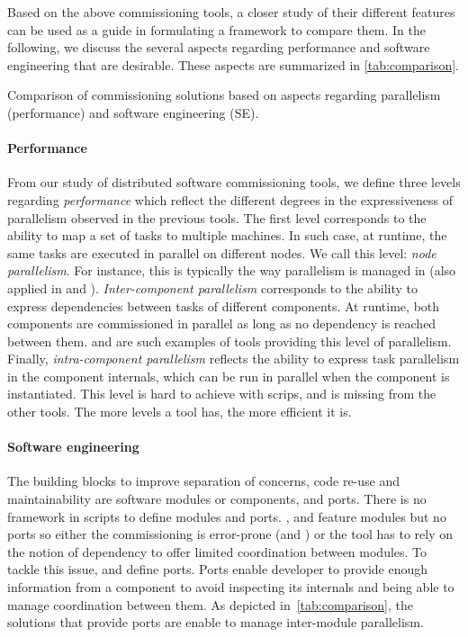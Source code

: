 Based on the above commissioning tools, a closer study of their different
features can be used as a guide in formulating a framework to compare them. In
the following, we discuss the several aspects regarding performance and software
engineering that are desirable. These aspects are summarized in
\cref{tab:comparison}.

\begin{table}[tp]
  \centering
  \small
  
  \caption{Comparison of commissioning solutions based on aspects
  regarding parallelism (performance) and software engineering (SE).}
  \label{tab:comparison}
\end{table}

\paragraph{Performance}
From our study of distributed software commissioning tools, we define three
levels regarding \emph{performance} which reflect the different degrees in
the expressiveness of parallelism observed in the previous tools.
The first level corresponds to the ability to map a set of tasks to multiple
machines. In such case, at runtime, the same tasks are executed in parallel on
different nodes. We call this level: \emph{node parallelism}. For instance, this
is typically the way parallelism is managed in \ansible (also applied in
\deployware and \kubernetes).
\emph{Inter-component parallelism} corresponds to the ability to express
dependencies between tasks of different components. At runtime, both components
are commissioned in parallel as long as no dependency is reached between them.
\aeolus and \juju are such examples of tools providing this level of
parallelism. Finally, \emph{intra-component parallelism} reflects the ability to
express task parallelism in the component internals, which can be run in
parallel when the component is instantiated. This level is hard to achieve with
\shell scrips, and is missing from the other tools.
The more levels a tool has, the more efficient it is.

\paragraph{Software engineering}
The building blocks to improve separation of concerns, code re-use and
maintainability are software modules or components, and ports.
There is no framework in \shell scripts to define modules and ports. \ansible,
\deployware and \kubernetes feature modules but no ports so either the
commissioning is error-prone (\ie \ansible and \kubernetes) or the tool has to
rely on the notion of dependency to offer limited coordination between modules.
To tackle this issue, \juju and \aeolus define ports. Ports enable developer to
provide enough information from a component to avoid inspecting its internals
and being able to manage coordination between them. As depicted
in~\cref{tab:comparison}, the solutions that provide ports are enable to manage
inter-module parallelism.

